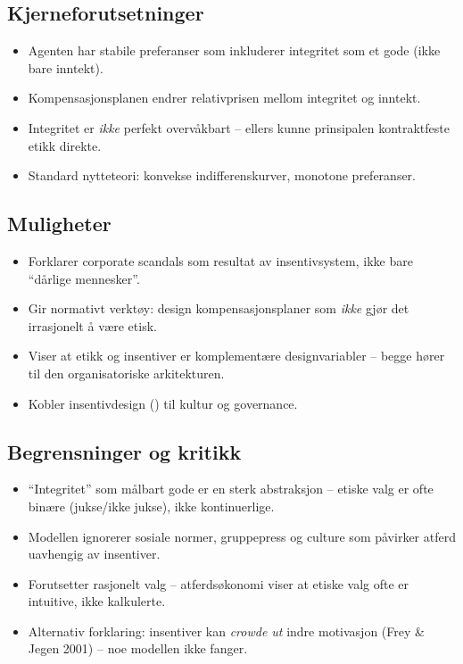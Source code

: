 \subsection*{Kjerneforutsetninger}
\begin{itemize}
\item Agenten har stabile preferanser som inkluderer integritet som et gode (ikke bare inntekt).
\item Kompensasjonsplanen endrer relativprisen mellom integritet og inntekt.
\item Integritet er \emph{ikke} perfekt overvåkbart -- ellers kunne prinsipalen kontraktfeste etikk direkte.
\item Standard nytteteori: konvekse indifferenskurver, monotone preferanser.
\end{itemize}

\subsection*{Muligheter}
\begin{itemize}
\item Forklarer corporate scandals som resultat av insentivsystem, ikke bare ``dårlige mennesker''.
\item Gir normativt verktøy: design kompensasjonsplaner som \emph{ikke} gjør det irrasjonelt å være etisk.
\item Viser at etikk og insentiver er komplementære designvariabler -- begge hører til den organisatoriske arkitekturen.
\item Kobler insentivdesign (\SThree) til kultur og governance.
\end{itemize}

\subsection*{Begrensninger og kritikk}
\begin{itemize}
\item ``Integritet'' som målbart gode er en sterk abstraksjon -- etiske valg er ofte binære (jukse/ikke jukse), ikke kontinuerlige.
\item Modellen ignorerer sosiale normer, gruppepress og culture som påvirker atferd uavhengig av insentiver.
\item Forutsetter rasjonelt valg -- atferdsøkonomi viser at etiske valg ofte er intuitive, ikke kalkulerte.
\item Alternativ forklaring: insentiver kan \emph{crowde ut} indre motivasjon (Frey \& Jegen 2001) -- noe modellen ikke fanger.
\end{itemize}

